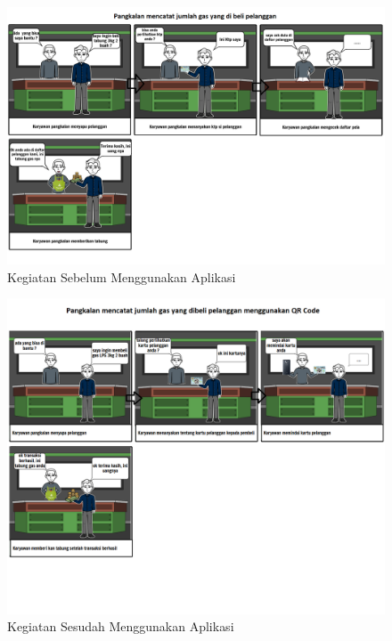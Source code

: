 	\vspace{-0.4cm}
	\begin{figure}[H]
		\center
		\includegraphics [width = 14cm]{gambar/storyboard/storyboard-1-(old)}
		\caption{Kegiatan Sebelum Menggunakan Aplikasi}
		\label{storyboardOld1}
	\end{figure}
	\vspace{-0.6cm}
	\begin{figure}[H]
		\center
		\includegraphics [width = 14cm]{gambar/storyboard/storyboard-1-(new)}
		\caption{Kegiatan Sesudah Menggunakan Aplikasi}
		\label{storyboardNew1}
	\end{figure}
	
	
	
